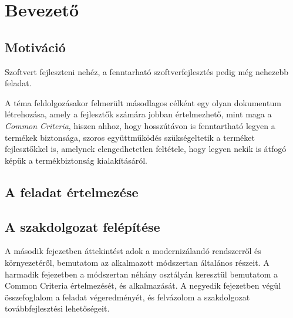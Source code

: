 \chapter{Bevezető}

\section{Motiváció}

Szoftvert fejleszteni nehéz, a fenntarható szoftverfejlesztés pedig még nehezebb feladat.

A téma feldolgozásakor felmerült másodlagos célként egy olyan dokumentum létrehozása, amely
a fejlesztők számára jobban értelmezhető, mint maga a \emph{Common Criteria}, hiszen ahhoz, hogy
hosszútávon is fenntartható legyen a termékek biztonsága, szoros együttműködés szükségeltetik
a terméket fejlesztőkkel is, amelynek elengedhetetlen feltétele, hogy legyen nekik is átfogó képük
a termékbiztonság kialakításáról.

\section{A feladat értelmezése}

\section{A szakdolgozat felépítése}
A második fejezetben áttekintést adok a modernizálandó rendszerről és környezetéről, bemutatom az
alkalmazott módszertan általános részeit. A harmadik fejezetben a módszertan néhány osztályán
keresztül bemutatom a Common Criteria értelmezését, és alkalmazását.
A negyedik fejezetben végül összefoglalom a feladat végeredményét, és felvázolom a szakdolgozat
továbbfejlesztési lehetőségeit.

